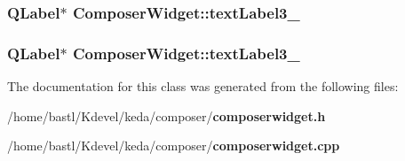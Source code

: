 \subsubsection{\setlength{\rightskip}{0pt plus 5cm}QLabel$\ast$ {\bf Composer\-Widget::text\-Label3\_}}\label{classComposerWidget_d54358d4c86932bbc6c039667005d66a}


\subsubsection{\setlength{\rightskip}{0pt plus 5cm}QLabel$\ast$ {\bf Composer\-Widget::text\-Label3\_}}\label{classComposerWidget_1face088464e99f9bc70402a48986e0a}




The documentation for this class was generated from the following files:\begin{CompactItemize}
\item 
/home/bastl/Kdevel/keda/composer/{\bf composerwidget.h}\item 
/home/bastl/Kdevel/keda/composer/{\bf composerwidget.cpp}\end{CompactItemize}
